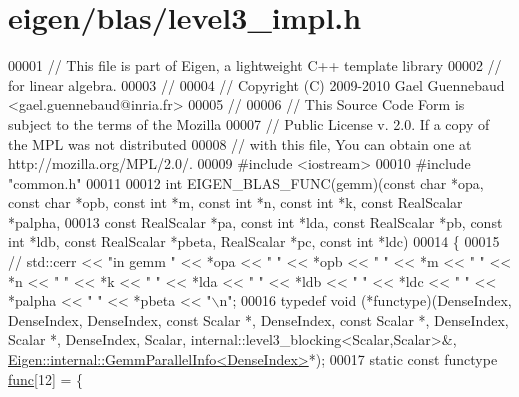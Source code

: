 \hypertarget{eigen_2blas_2level3__impl_8h_source}{}\section{eigen/blas/level3\+\_\+impl.h}
\label{eigen_2blas_2level3__impl_8h_source}

\begin{DoxyCode}
00001 \textcolor{comment}{// This file is part of Eigen, a lightweight C++ template library}
00002 \textcolor{comment}{// for linear algebra.}
00003 \textcolor{comment}{//}
00004 \textcolor{comment}{// Copyright (C) 2009-2010 Gael Guennebaud <gael.guennebaud@inria.fr>}
00005 \textcolor{comment}{//}
00006 \textcolor{comment}{// This Source Code Form is subject to the terms of the Mozilla}
00007 \textcolor{comment}{// Public License v. 2.0. If a copy of the MPL was not distributed}
00008 \textcolor{comment}{// with this file, You can obtain one at http://mozilla.org/MPL/2.0/.}
00009 \textcolor{preprocessor}{#include <iostream>}
00010 \textcolor{preprocessor}{#include "common.h"}
00011 
00012 \textcolor{keywordtype}{int} EIGEN\_BLAS\_FUNC(gemm)(\textcolor{keyword}{const} \textcolor{keywordtype}{char} *opa, \textcolor{keyword}{const} \textcolor{keywordtype}{char} *opb, \textcolor{keyword}{const} \textcolor{keywordtype}{int} *m, \textcolor{keyword}{const} \textcolor{keywordtype}{int} *n, \textcolor{keyword}{const} \textcolor{keywordtype}{int} *k, \textcolor{keyword}{const}
       RealScalar *palpha,
00013                           \textcolor{keyword}{const} RealScalar *pa, \textcolor{keyword}{const} \textcolor{keywordtype}{int} *lda, \textcolor{keyword}{const} RealScalar *pb, \textcolor{keyword}{const} \textcolor{keywordtype}{int} *ldb, \textcolor{keyword}{const}
       RealScalar *pbeta, RealScalar *pc, \textcolor{keyword}{const} \textcolor{keywordtype}{int} *ldc)
00014 \{
00015 \textcolor{comment}{//   std::cerr << "in gemm " << *opa << " " << *opb << " " << *m << " " << *n << " " << *k << " " << *lda
       << " " << *ldb << " " << *ldc << " " << *palpha << " " << *pbeta << "\(\backslash\)n";}
00016   \textcolor{keyword}{typedef} void (*functype)(DenseIndex, DenseIndex, DenseIndex, \textcolor{keyword}{const} Scalar *, DenseIndex, \textcolor{keyword}{const} Scalar *, 
      DenseIndex, Scalar *, DenseIndex, Scalar, internal::level3\_blocking<Scalar,Scalar>&, 
      \hyperlink{struct_eigen_1_1internal_1_1_gemm_parallel_info}{Eigen::internal::GemmParallelInfo<DenseIndex>}*);
00017   \textcolor{keyword}{static} \textcolor{keyword}{const} functype \hyperlink{structfunc}{func}[12] = \{

\end{DoxyCode}
